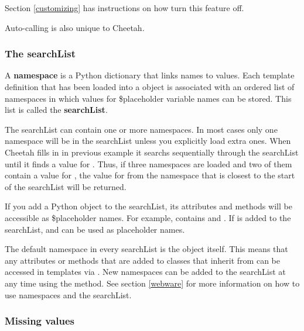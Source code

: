 Section \ref{customizing} has instructions on how turn this feature off.

Auto-calling is also unique to Cheetah.

\subsubsection{The searchList}
\label{TDL.placeholders.searchList}

A {\bf namespace} is a Python dictionary that links names to values. Each
template definition that has been loaded into a  object is
associated with an ordered list of namespaces in which values for \$placeholder
variable names can be stored.  This list is called the {\bf searchList}.

The searchList can contain one or more namespaces.  In most cases only one
namespace will be in the searchList unless you explicitly load extra ones.  When
Cheetah fills in  in previous example it searchs sequentially
through the searchList until it finds a value for .  Thus, if
three namespaces are loaded and two of them contain a value for
, the value for  from the namespace that is
closest to the start of the searchList will be returned.

If you add a Python object to the searchList, its attributes and methods will be
accessible as \$placeholder names.  For example,  contains
 and .  If  is added to the
searchList,  and  can be used as placeholder
names.  

The default namespace in every searchList is the  object itself.
This means that any attributes or methods that are added to classes that inherit
from  can be accessed in templates via .  New
namespaces can be added to the searchList at any time using the
 method.  See section \ref{webware} for more
information on how to use namespaces and the searchList.

\subsubsection{Missing values}
\label{TDL.placeholders.missing}

